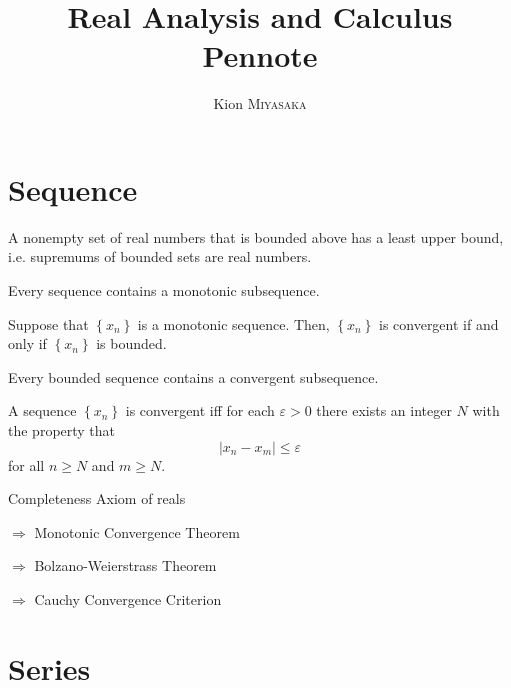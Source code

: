 \documentclass[11pt]{article}
\title{\huge \bfseries Real  Analysis and Calculus Pennote}
\author{Kion \textsc{Miyasaka}}
\def\bm#1{\textbf{#1}}
\begin{document}
\maketitle

\section{Sequence}

\begin{tcolorbox}[colback=blue!5,colframe=black!5!red,title=\bm{Axiom of Completeness}]
	A nonempty set of real numbers that is bounded above has a least upper bound, i.e. supremums of bounded sets are real numbers.
\end{tcolorbox}


\begin{tcolorbox}[colback=blue!5,colframe=black!75!green,title=\bm{Monotone Subsequence}]
	Every sequence contains a monotonic subsequence.
	\begin{tcolorbox}[colback=blue!5,colframe=black!75!black,title=\bm{Monotone Convergence Theorem}]
	Suppose that $\left\{x_{n}\right\}$ is a monotonic sequence. Then, $\left\{x_{n}\right\}$ is convergent if and only if $\left\{x_{n}\right\}$ is bounded.
\end{tcolorbox}

\end{tcolorbox}


\begin{tcolorbox}[colback=blue!5,colframe=black!75!black,title=\bm{Bolzano-Weierstrass}]
Every bounded sequence contains a convergent subsequence.
\end{tcolorbox}
 
 \begin{tcolorbox}[colback=blue!5,colframe=black!75!black,title=\bm{Cauchy Convergence Criterion}]
 A sequence $\left\{x_{n}\right\}$ is convergent iff for each $\varepsilon>0$ there exists an integer $N$ with the property that
$$
\left|x_{n}-x_{m}\right| \leq \varepsilon
$$
for all $n \geq N$ and $m \geq N$.	
 \end{tcolorbox}
 
 \qquad Completeness Axiom of reals
 
$\Longrightarrow$ Monotonic Convergence Theorem

$\Longrightarrow$ Bolzano-Weierstrass Theorem

$\Longrightarrow$ Cauchy Convergence Criterion


\newpage
\section{Series}
\end{document}
